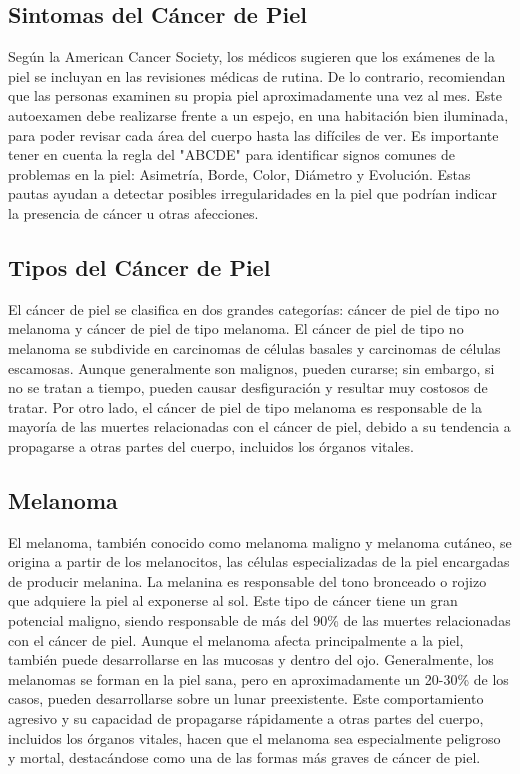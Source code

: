 \subsection{Sintomas del Cáncer de Piel}
Según la American Cancer Society, los médicos sugieren que los exámenes de la piel se incluyan en las revisiones médicas de rutina. De lo contrario, recomiendan que las personas examinen su propia piel aproximadamente una vez al mes. Este autoexamen debe realizarse frente a un espejo, en una habitación bien iluminada, para poder revisar cada área del cuerpo hasta las difíciles de ver. Es importante tener en cuenta la regla del "ABCDE" para identificar signos comunes de problemas en la piel: Asimetría, Borde, Color, Diámetro y Evolución. Estas pautas ayudan a detectar posibles irregularidades en la piel que podrían indicar la presencia de cáncer u otras afecciones.
\parencite{information_cancer}

\subsection{Tipos del Cáncer de Piel}
El cáncer de piel se clasifica en dos grandes categorías: cáncer de piel de tipo no melanoma y cáncer de piel de tipo melanoma. El cáncer de piel de tipo no melanoma se subdivide en carcinomas de células basales y carcinomas de células escamosas. Aunque generalmente son malignos, pueden curarse; sin embargo, si no se tratan a tiempo, pueden causar desfiguración y resultar muy costosos de tratar. Por otro lado, el cáncer de piel de tipo melanoma es responsable de la mayoría de las muertes relacionadas con el cáncer de piel, debido a su tendencia a propagarse a otras partes del cuerpo, incluidos los órganos vitales.

\subsection{Melanoma}
El melanoma, también conocido como melanoma maligno y melanoma cutáneo, se origina a partir de los melanocitos, las células especializadas de la piel encargadas de producir melanina. La melanina es responsable del tono bronceado o rojizo que adquiere la piel al exponerse al sol. Este tipo de cáncer tiene un gran potencial maligno, siendo responsable de más del 90\% de las muertes relacionadas con el cáncer de piel. Aunque el melanoma afecta principalmente a la piel, también puede desarrollarse en las mucosas y dentro del ojo. Generalmente, los melanomas se forman en la piel sana, pero en aproximadamente un 20-30\% de los casos, pueden desarrollarse sobre un lunar preexistente.  \parencite{cancer_tipo_melanoma}
Este comportamiento agresivo y su capacidad de propagarse rápidamente a otras partes del cuerpo, incluidos los órganos vitales, hacen que el melanoma sea especialmente peligroso y mortal, destacándose como una de las formas más graves de cáncer de piel.

